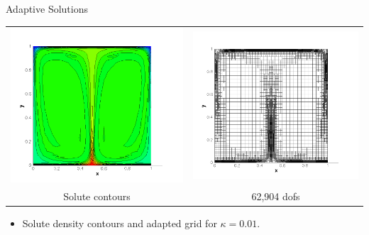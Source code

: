 \documentclass[compress,12pt]{beamer}
\begin{document}
\begin{frame}{Adaptive Solutions}
  {
    \begin{center}
      \begin{tabular}{cc} \\
	\includegraphics[width=.5\textwidth]{figures/s_adapt_kappa_0_01}&
	\includegraphics[width=.5\textwidth]{figures/grid_adapt_kappa_0_01}\\
	Solute contours &
	62,904 dofs
      \end{tabular}\end{center}
    \begin{itemize}
      
    \item Solute density contours and adapted grid for $\kappa=0.01$.
    \end{itemize}
  }

\end{frame}
\end{document}
